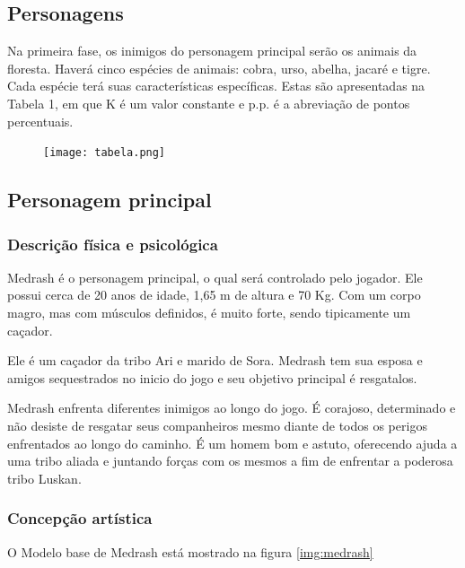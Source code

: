 \subsection{Personagens}
Na primeira fase, os inimigos do personagem principal serão os animais da floresta. 
Haverá cinco espécies de animais: cobra, urso, abelha, jacaré e tigre. Cada espécie 
terá suas características específicas. Estas são apresentadas na Tabela 1, em que K 
é um valor constante e p.p. é a abreviação de pontos percentuais.

\begin{figure}[H]
 \centering
 \texttt{[image: tabela.png]}
 \caption{}
 \label{img:tabela}
\end{figure}

\subsection{Personagem principal}
\subsubsection{Descrição física e psicológica}
Medrash é o personagem principal, o qual será controlado pelo jogador. Ele
 possui cerca de 20 anos de idade, 1,65 m de altura e 70 Kg. Com um corpo
 magro, mas com músculos definidos, é muito forte, sendo tipicamente um
 caçador.

Ele é um caçador da tribo Ari e marido de Sora. Medrash tem sua esposa e
 amigos sequestrados no inicio do jogo e seu objetivo principal é 
resgatalos.

Medrash enfrenta diferentes inimigos ao longo do jogo. É corajoso,
 determinado e não desiste de resgatar seus companheiros mesmo diante de
 todos os perigos enfrentados ao longo do caminho. É um homem bom e astuto,
 oferecendo ajuda a uma tribo aliada e juntando forças com os mesmos a fim
 de enfrentar a poderosa tribo Luskan.

\subsubsection{Concepção artística}
O Modelo base de Medrash está mostrado na figura \ref{img:medrash}

